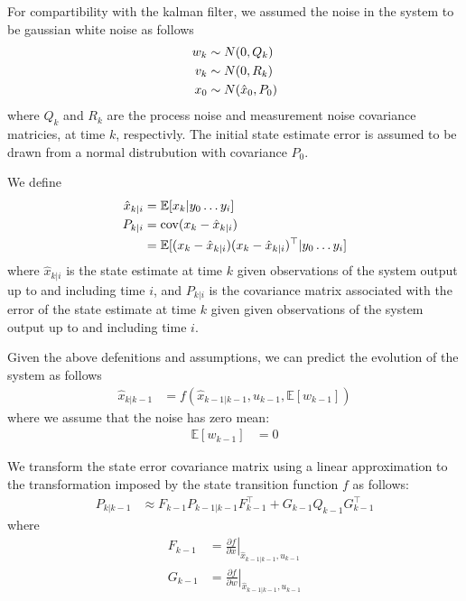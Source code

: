 \documentclass[]{article}
\begin{document}
{For compartibility with the kalman filter, we assumed the noise in the system to be gaussian white noise as follows
\begin{align}
	w_k &\sim N(0,Q_k) \notag \\
	v_k &\sim N(0,R_k) \notag \\
	x_0 &\sim N(\hat{x}_0,P_0)
	\label{eqn:noisedef}
\end{align}
where $Q_k$ and $R_k$ are the process noise and measurement noise covariance matricies, at time $k$, respectivly. The initial state estimate error is assumed to be drawn from a normal distrubution with covariance $P_0$.

We define
\begin{align}
	\hat{x}_{k|i} 	&= \mathbb{E}[x_k|y_0 \hdots y_i] \\
	P_{k|i} 		&= \operatorname{cov}(x_k - \hat{x}_{k|i}) \notag \\
					&= \mathbb{E}[ (x_k-\hat{x}_{k|i}) (x_k-\hat{x}_{k|i})^\top | y_0 \hdots y_i]
\end{align}
where $\hat{x}_{k|i}$ is the state estimate at time $k$ given observations of the system output up to and including time $i$, and $P_{k|i}$ is the covariance matrix associated with the error of the state estimate at time $k$ given given observations of the system output up to and including time $i$.

Given the above defenitions and assumptions, we can predict the evolution of the system as follows
\begin{align}
	\hat{x}_{k|k-1} &= f(\hat{x}_{k-1|k-1}, u_{k-1}, \mathbb{E}[w_{k-1}])
	\label{eqn:predictx}
\end{align}
where we assume that the noise has zero mean:
\begin{align}
	\mathbb{E}[w_{k-1}] &= 0
\end{align}

We transform the state error covariance matrix using a linear approximation to the transformation imposed by the state transition function $f$ as follows:
\begin{align}
	P_{k|k-1} &\approx F_{k-1} P_{k-1|k-1} F_{k-1}^\top + G_{k-1} Q_{k-1} G_{k-1}^\top
	\label{eqn:predictP}
\end{align}
where
\begin{align}
	F_{k-1} &= \left . \frac{\partial f}{\partial x} \right \vert _{\hat{x}_{k-1|k-1},u_{k-1}} \\
	G_{k-1} &= \left . \frac{\partial f}{\partial w} \right \vert _{\hat{x}_{k-1|k-1},u_{k-1}}
\end{align}

}
\end{document}
